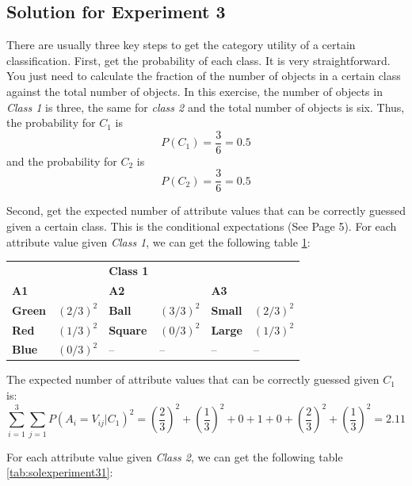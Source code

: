 \subsection{Solution for Experiment 3}
There are usually three key steps to get the category utility of a certain classification. First, get the probability of each class. It is very straightforward. You just need to calculate the fraction of the number of objects in a certain class against the total number of objects. In this exercise, the number of objects in \emph{Class 1} is three, the same for \emph{class 2} and the total number of objects is six. Thus, the probability for $C_1$ is $$P(C_1)=\frac{3}{6}=0.5$$ and the probability for $C_2$ is $$P(C_2)=\frac{3}{6}=0.5$$ 

Second, get the expected number of attribute values that can be correctly guessed given a certain class. This is the conditional expectations (See Page 5). For each attribute value given \emph{Class 1}, we can get the following table \ref{tab:solexperiment3}:

\begin{table}[!ht]
 \ttabbox{\caption{}}
 {
 \centering
 \begin{tabular}{l l l l l l}\hline
 \textbf{ } & \textbf{ } & \textbf{Class 1 } & \textbf{} & \textbf{ } & \textbf{ } \\
 \textbf{A1} & \textbf{ } & \textbf{A2} & \textbf{ } & \textbf{A3} & \textbf{ } \\\hline
 \textbf{Green} & $({2}/{3})^2$ & \textbf{Ball} & $({3}/{3})^2$ & \textbf{Small} & $({2}/{3})^2$ \\
 \textbf{Red} & $({1}/{3})^2$ & \textbf{Square} & $(0/3)^2$ & \textbf{Large} & $({1}/{3})^2$ \\
 \textbf{Blue} & $(0/3)^2$ & -- & -- & -- & -- \\\hline
 \end{tabular}
 \label{tab:solexperiment3}}
 \end{table}
 The expected number of attribute values that can be correctly guessed given $C_1$ is: $$\sum_{i=1}^{3} \sum_{j=1}^{}P(A_i=V_{ij}\left|C_1\right.)^2=(\frac{2}{3})^2+(\frac{1}{3})^2+0+1+0+(\frac{2}{3})^2+(\frac{1}{3})^2=2.11$$
 
For each attribute value given \emph{Class 2}, we can get the following table \ref{tab:solexperiment31}:
  
